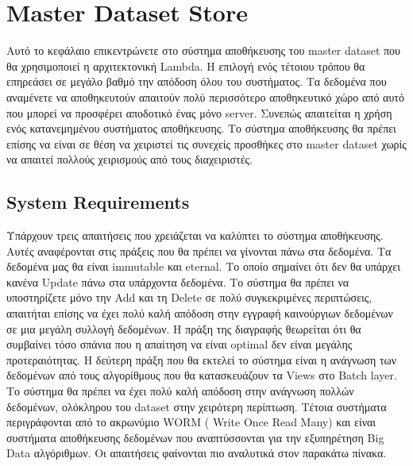 \chapter{Master Dataset Store}

Αυτό το κεφάλαιο επικεντρώνετε στο σύστημα αποθήκευσης του master dataset που θα χρησιμοποιεί η αρχιτεκτονική Lambda. Η επιλογή ενός τέτοιου τρόπου θα επηρεάσει σε μεγάλο βαθμό την απόδοση όλου του συστήματος. Τα δεδομένα που αναμένετε να αποθηκευτούν απαιτούν πολύ περισσότερο αποθηκευτικό χώρο από αυτό που μπορεί να προσφέρει αποδοτικό ένας μόνο server. Συνεπώς απαιτείται η χρήση ενός κατανεμημένου συστήματος αποθήκευσης. Το σύστημα αποθήκευσης θα πρέπει επίσης να είναι σε θέση να χειριστεί τις συνεχείς προσθήκες στο master dataset χωρίς να απαιτεί πολλούς χειρισμούς από τους διαχειριστές.

\vspace{60mm}

\section{System Requirements}
Υπάρχουν τρεις απαιτήσεις που χρειάζεται να καλύπτει το σύστημα αποθήκευσης. Αυτές αναφέρονται στις πράξεις που θα πρέπει να γίνονται πάνω στα δεδομένα. 
Τα δεδομένα μας θα είναι immutable και eternal. Το οποίο σημαίνει ότι δεν θα υπάρχει κανένα Update πάνω στα υπάρχοντα δεδομένα. Το σύστημα θα πρέπει να υποστηρίζετε μόνο την Add και τη Delete σε πολύ συγκεκριμένες περιπτώσεις, απαιτήται επίσης να έχει πολύ καλή απόδοση στην εγγραφή καινούργιων δεδομένων σε μια μεγάλη συλλογή δεδομένων. Η πράξη της διαγραφής θεωρείται ότι θα συμβαίνει τόσο σπάνια που η απαίτηση να είναι optimal δεν είναι μεγάλης προτεραιότητας.
\newline  
Η δεύτερη πράξη που θα εκτελεί το σύστημα είναι η ανάγνωση των δεδομένων από τους αλγορίθμους που θα κατασκευάζουν τα Views στο Batch layer. Το σύστημα θα πρέπει να έχει πολύ καλή απόδοση στην ανάγνωση πολλών δεδομένων, ολόκληρου του dataset στην χειρότερη περίπτωση.
Τέτοια συστήματα περιγράφονται από το ακρωνύμιο WORM ( Write Once Read Many) και είναι συστήματα αποθήκευσης δεδομένων που αναπτύσσονται για την εξυπηρέτηση Big Data αλγόριθμων.
\newline
Οι απαιτήσεις φαίνονται πιο αναλυτικά στον παρακάτω πίνακα.

